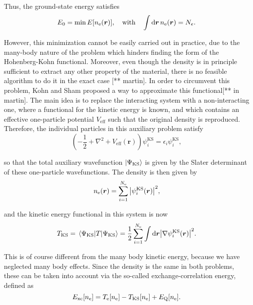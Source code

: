 Thus, the ground-state energy satisfies
\begin{equation}
E_0=\min E[n_{\mathrm e}(\bm r)],\quad \mathrm{with}\quad \int \mathrm{d}\bm r\, n_{\mathrm e}(\bm{r})=N_e.
\end{equation}

However, this minimization cannot be easily carried out in practice, due to the many-body nature of the problem which hinders finding the form of the Hohenberg-Kohn functional. Moreover, even though the density is in principle sufficient to extract any other property of the material, there is no feasible algorithm to do it in the exact case [** martin]. In order to circumvent this problem, Kohn and Sham proposed a way to approximate this functional[** in martin]. The main idea is to replace the interacting system with a non-interacting one, where a functional for the kinetic energy is known, and which contains an effective one-particle potential \(V_{\mathrm{eff}}\) such that the original density is reproduced. Therefore, the individual particles in this auxiliary problem satisfy
\begin{equation}
\label{ks-eq}
\left(-\frac1 2+\nabla^2+V_{\mathrm{eff}}(\bm r)\right)\psi^{\mathrm{KS}}_i=\epsilon_i \psi^{\mathrm{KS}}_i,
\end{equation}

so that the total auxiliary wavefunction \(\ket{\Psi_{\mathrm{KS}}}\) is given by the Slater determinant of these one-particle wavefunctions. The density is then given by
\begin{equation}
	n_{\mathrm{e}}(\bm r)=\sum^{N_{\mathrm e}}_{i=1}\abs{\psi_i^{\mathrm{KS}}(\bm r)}^2,
\end{equation}

and the kinetic energy functional in this system is now
\begin{equation}
T_{\mathrm{KS}}=\expval{T}{\Psi_{\mathrm{KS}}}=\frac1 2\sum_{i=1}^{N_{\mathrm e}}\int\mathrm{d}\bm r\abs{\nabla\psi_i^{\mathrm{KS}}(\bm r)}^2.
\end{equation}

This is of course different from the many body kinetic energy, because we have neglected many body effects. Since the density is the same in both problems, these can be taken into account via the so-called exchange-correlation energy, defined as
\begin{equation}
E_{\mathrm{xc}}[n_{\mathrm{e}}]=T_{\mathrm{e}}[n_{\mathrm{e}}]-T_{\mathrm{KS}}[n_{\mathrm{e}}]+E_{\mathrm{Q}}[n_{\mathrm{e}}].
\end{equation}

